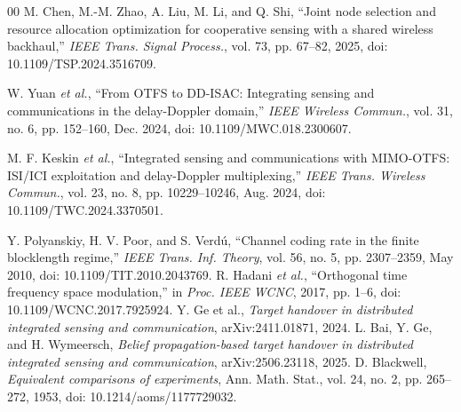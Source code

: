\begin{thebibliography}{00}
	M. Chen, M.-M. Zhao, A. Liu, M. Li, and Q. Shi, ``Joint node selection and resource allocation optimization for cooperative sensing with a shared wireless backhaul,'' \emph{IEEE Trans. Signal Process.}, vol. 73, pp. 67--82, 2025, doi: 10.1109/TSP.2024.3516709.
	
	W. Yuan \emph{et al.}, ``From OTFS to DD-ISAC: Integrating sensing and communications in the delay-Doppler domain,'' \emph{IEEE Wireless Commun.}, vol. 31, no. 6, pp. 152--160, Dec. 2024, doi: 10.1109/MWC.018.2300607.
	
	M. F. Keskin \emph{et al.}, ``Integrated sensing and communications with MIMO-OTFS: ISI/ICI exploitation and delay-Doppler multiplexing,'' \emph{IEEE Trans. Wireless Commun.}, vol. 23, no. 8, pp. 10229--10246, Aug. 2024, doi: 10.1109/TWC.2024.3370501.
	
Y. Polyanskiy, H. V. Poor, and S. Verd\'u, ``Channel coding rate in the finite blocklength regime,'' \emph{IEEE Trans. Inf. Theory}, vol. 56, no. 5, pp. 2307--2359, May 2010, doi: 10.1109/TIT.2010.2043769.
R. Hadani \emph{et al.}, ``Orthogonal time frequency space modulation,'' in \emph{Proc. IEEE WCNC}, 2017, pp. 1--6, doi: 10.1109/WCNC.2017.7925924.
Y. Ge et al., \emph{Target handover in distributed integrated sensing and
communication}, arXiv:2411.01871, 2024.
L. Bai, Y. Ge, and H. Wymeersch, \emph{Belief propagation-based target handover
in distributed integrated sensing and communication}, arXiv:2506.23118, 2025.
D. Blackwell, \emph{Equivalent comparisons of experiments}, Ann. Math. Stat.,
vol. 24, no. 2, pp. 265--272, 1953, doi: 10.1214/aoms/1177729032.
\end{thebibliography}


